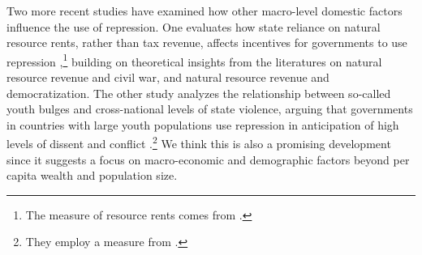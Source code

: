 \documentclass[11pt]{article}
\begin{document}
Two more recent studies have examined how other macro-level domestic factors influence the use of repression. One evaluates how state reliance on natural resource rents, rather than tax revenue, affects incentives for governments to use repression \citep{DemerittYoung2013},\footnote{The measure of resource rents comes from \citet{Ross2006}.} building on theoretical insights from the literatures on natural resource revenue and civil war, and natural resource revenue and democratization. The other study analyzes the relationship between so-called youth bulges and cross-national levels of state violence, arguing that governments in countries with large youth populations use repression in anticipation of high levels of dissent and conflict \citep{NordasDavenport2013}.\footnote{They employ a measure from \citet{Urdal2006}.} We think this is also a promising development since it suggests a focus on macro-economic and demographic factors beyond per capita wealth and population size. 
\end{document}
